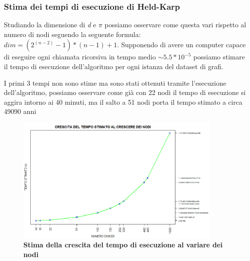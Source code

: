 \documentclass[]{article}
\begin{document}
\begin{flushleft}
\newpage
\subsubsection{Stima dei tempi di esecuzione di Held-Karp}
Studiando la dimensione di \textit{d} e $\pi$ possiamo osservare come questa vari rispetto al numero di nodi seguendo la seguente formula: $dim = (2^{(n-2)} - 1) * (n-1) + 1$.
Supponendo di avere un computer capace di eseguire ogni chiamata ricorsiva in tempo medio $\sim 5.5*10^{-5}$ possiamo stimare il tempo di esecuzione dell'algoritmo per ogni istanza del dataset di grafi.

I primi 3 tempi non sono stime ma sono stati ottenuti tramite l'esecuzione dell'algoritmo, possiamo osservare come già con 22 nodi il tempo di esecuzione si aggira intorno ai 40 minuti, ma il salto a 51 nodi porta il tempo stimato a circa 49090 anni
\begin{figure}[h]
\centering
\includegraphics[width=0.9\textwidth, height=\textheight,keepaspectratio]{STIME_TEMPO.png}
\caption{\textbf{Stima della crescita del tempo di esecuzione al variare dei nodi}}
\label{STIME_temp}
\end{figure}
\end{flushleft}
\end{document}
